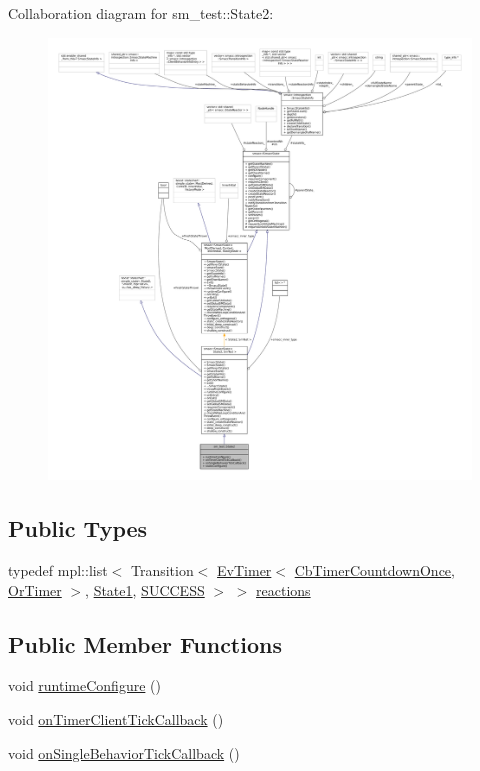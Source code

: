 Collaboration diagram for sm\+\_\+test\+:\+:State2\+:
\nopagebreak
\begin{figure}[H]
\begin{center}
\leavevmode
\includegraphics[width=350pt]{structsm__test_1_1State2__coll__graph}
\end{center}
\end{figure}
\subsection*{Public Types}
\begin{DoxyCompactItemize}
\item 
typedef mpl\+::list$<$ Transition$<$ \hyperlink{structros__timer__client_1_1EvTimer}{Ev\+Timer}$<$ \hyperlink{classros__timer__client_1_1CbTimerCountdownOnce}{Cb\+Timer\+Countdown\+Once}, \hyperlink{classsm__test_1_1OrTimer}{Or\+Timer} $>$, \hyperlink{structsm__test_1_1State1}{State1}, \hyperlink{structsmacc_1_1default__transition__tags_1_1SUCCESS}{S\+U\+C\+C\+E\+SS} $>$ $>$ \hyperlink{structsm__test_1_1State2_a6a85570d55b07b8c3293a5eda604919c}{reactions}
\end{DoxyCompactItemize}
\subsection*{Public Member Functions}
\begin{DoxyCompactItemize}
\item 
void \hyperlink{structsm__test_1_1State2_a523b828e166415a7cb99311f1d24c2a2}{runtime\+Configure} ()
\item 
void \hyperlink{structsm__test_1_1State2_a94c9dbc4a208d69b8c47c5b3647251f0}{on\+Timer\+Client\+Tick\+Callback} ()
\item 
void \hyperlink{structsm__test_1_1State2_a9194fa7bd7e98bcc9e3de54c0e7c3826}{on\+Single\+Behavior\+Tick\+Callback} ()
\end{DoxyCompactItemize}
